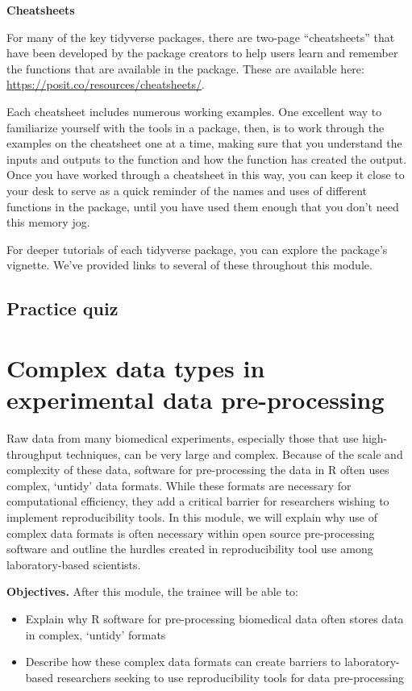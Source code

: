 \documentclass[]{tufte-book}
\providecommand{\tightlist}{%
  \setlength{\itemsep}{0pt}\setlength{\parskip}{0pt}}
\begin{document}
\textbf{Cheatsheets}

For many of the key tidyverse packages, there are two-page ``cheatsheets'' that
have been developed by the package creators to help users learn and remember
the functions that are available in the package. These are available here:
\url{https://posit.co/resources/cheatsheets/}.

Each cheatsheet includes numerous working examples. One excellent way to
familiarize yourself with the tools in a package, then, is to work through the
examples on the cheatsheet one at a time, making sure that you understand the
inputs and outputs to the function and how the function has created the output.
Once you have worked through a cheatsheet in this way, you can keep it close
to your desk to serve as a quick reminder of the names and uses of different
functions in the package, until you have used them enough that you don't need
this memory jog.

For deeper tutorials of each tidyverse package, you can explore the
package's vignette. We've provided links to several of these throughout this
module.

\subsection{Practice quiz}\label{practice-quiz}

\section{Complex data types in experimental data pre-processing}\label{module15}

Raw data from many biomedical experiments, especially those that use
high-throughput techniques, can be very large and complex. Because of the scale
and complexity of these data, software for pre-processing the data in R often
uses complex, `untidy' data formats. While these formats are necessary for
computational efficiency, they add a critical barrier for researchers wishing to
implement reproducibility tools. In this module, we will explain why use of
complex data formats is often necessary within open source pre-processing
software and outline the hurdles created in reproducibility tool use among
laboratory-based scientists.

\textbf{Objectives.} After this module, the trainee will be able to:

\begin{itemize}
\tightlist
\item
  Explain why R software for pre-processing biomedical data often stores
  data in complex, `untidy' formats
\item
  Describe how these complex data formats can create barriers to
  laboratory-based researchers seeking to use reproducibility tools for
  data pre-processing
\end{itemize}
\end{document}

